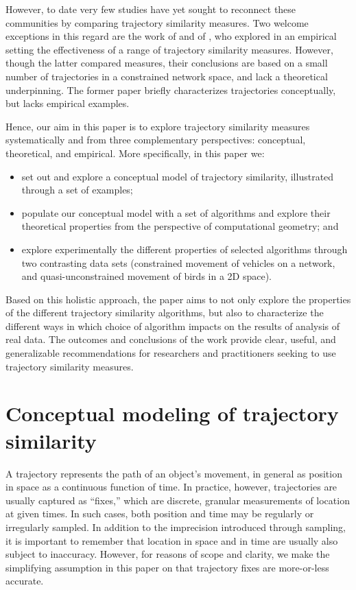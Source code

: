 \documentclass{interact}
\begin{document}
However, to date very few studies have yet sought to reconnect these communities by comparing trajectory similarity measures. Two welcome exceptions in this regard are the work of \cite{magdy2015review} and of \cite{wang2013effectiveness}, who explored in an empirical setting the effectiveness of a range of trajectory similarity measures. However, though the latter compared measures, their conclusions are based on a small number of trajectories in a constrained network space, and lack a theoretical underpinning. The former paper briefly characterizes trajectories conceptually, but lacks empirical examples.

Hence, our aim in this paper is to explore trajectory similarity measures systematically and from three complementary perspectives: conceptual, theoretical, and empirical. More specifically, in this paper we:

\begin{itemize}
\item set out and explore a conceptual model of trajectory similarity, illustrated through a set of examples;
\item populate our conceptual model with a set of algorithms and explore their theoretical properties from the perspective of computational geometry; and
\item explore experimentally the different properties of selected algorithms through two contrasting data sets (constrained movement of vehicles on a network, and quasi-unconstrained movement of birds in a 2D space).
\end{itemize}

Based on this holistic approach, the paper aims to not only explore the properties of the different trajectory similarity algorithms, but also to characterize the different ways in which choice of algorithm impacts on the results of analysis of real data. The outcomes and conclusions of the work provide clear, useful, and generalizable recommendations for researchers and practitioners seeking to use trajectory similarity measures.

\section{Conceptual modeling of trajectory similarity}
	\label{sub:conceptual}

A trajectory represents the path of an object's movement, in general as position in space as a continuous function of time. In practice, however, trajectories are usually captured as ``fixes,'' which are discrete, granular measurements of location at given times. In such cases, both position and time may be regularly or irregularly sampled. In addition to the imprecision introduced through sampling, it is important to remember that location in space and in time are usually also subject to inaccuracy. However, for reasons of scope and clarity, we make the simplifying assumption in this paper on that trajectory fixes are more-or-less accurate.
\end{document}
